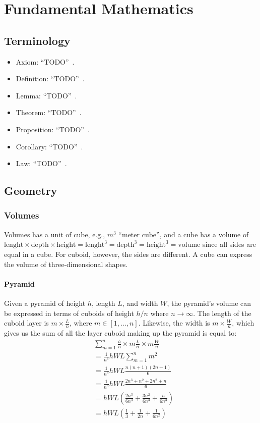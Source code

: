 \chapter{Fundamental Mathematics}

\section{Terminology}
\begin{itemize}
\item Axiom: ``TODO''~\cite{oed}.
\item Definition: ``TODO''~\cite{oed}.
\item Lemma: ``TODO''~\cite{oed}.
\item Theorem: ``TODO''~\cite{oed}.
\item Proposition: ``TODO''~\cite{oed}.
\item Corollary: ``TODO''~\cite{oed}.
\item Law: ``TODO''~\cite{oed}.
\end{itemize}


\section{Geometry}
\subsection{Volumes}
Volumes has a unit of cube, e.g., $m^3$ ``meter cube'', and a cube has a volume of $\text{lenght}\times\text{depth}\times\text{height} = \text{lenght}^3 = \text{depth}^3 = \text{height}^3 = \text{volume}$ since all sides are equal in a cube. For cuboid, however, the sides are different. A cube can express the volume of three-dimensional shapes.

\subsubsection{Pyramid}
Given a pyramid of height $h$, length $L$, and width $W$, the pyramid's volume can be expressed in terms of cuboids of height $h/n$ where $n\to\infty$. The length of the cuboid layer is $m\times\frac{L}{n}$, where $m\in[1,\ldots,n]$. Likewise, the width is $m\times\frac{W}{n}$, which gives us the sum of all the layer cuboid making up the pyramid is equal to:
\begin{align*}
  &\sum_{m=1}^n\frac{h}{n}\times m\frac{L}{n}\times m\frac{W}{n} \\
  &=\frac{1}{n^3}hWL\sum_{m=1}^n m^2 \\
  &=\frac{1}{n^3}hWL\frac{n(n+1)(2n+1)}{6} \\
  &=\frac{1}{n^3}hWL\frac{2n^3+n^2+2n^2+n}{6} \\
  &=hWL\left(\frac{2n^3}{6n^3}+\frac{3n^2}{6n^3}+\frac{n}{6n^3}\right) \\
  &=hWL\left(\frac{1}{3}+\frac{1}{2n}+\frac{1}{6n^2}\right) \\
\end{align*}


